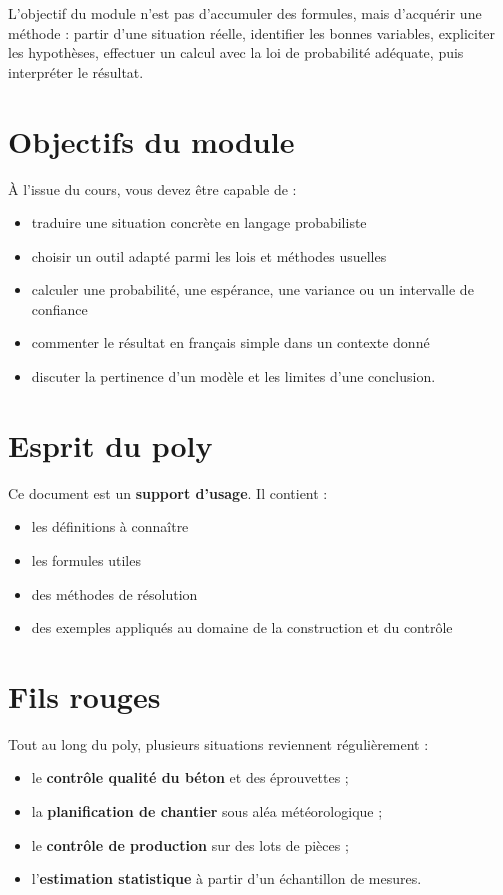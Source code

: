 L'objectif du module n'est pas d'accumuler des formules, mais d'acquérir une méthode : partir d'une situation réelle, identifier les bonnes variables, expliciter les hypothèses, effectuer un calcul avec la loi de probabilité adéquate, puis interpréter le résultat.

\section*{Objectifs du module}

À l'issue du cours, vous devez être capable de :
\begin{itemize}
    \item traduire une situation concrète en langage probabiliste 
    \item choisir un outil adapté parmi les lois et méthodes usuelles 
    \item calculer une probabilité, une espérance, une variance ou un intervalle de confiance 
    \item commenter le résultat en français simple dans un contexte donné 
    \item discuter la pertinence d'un modèle et les limites d'une conclusion.
\end{itemize}

\section*{Esprit du poly}

Ce document est un \textbf{support d'usage}. Il contient :
\begin{itemize}
    \item les définitions à connaître 
    \item les formules utiles 
    \item des méthodes de résolution 
    \item des exemples appliqués au domaine de la construction et du contrôle
\end{itemize}

\section*{Fils rouges}

Tout au long du poly, plusieurs situations reviennent régulièrement :
\begin{itemize}
    \item le \textbf{contrôle qualité du béton} et des éprouvettes ;
    \item la \textbf{planification de chantier} sous aléa météorologique ;
    \item le \textbf{contrôle de production} sur des lots de pièces ;
    \item l'\textbf{estimation statistique} à partir d'un échantillon de mesures.
\end{itemize}
